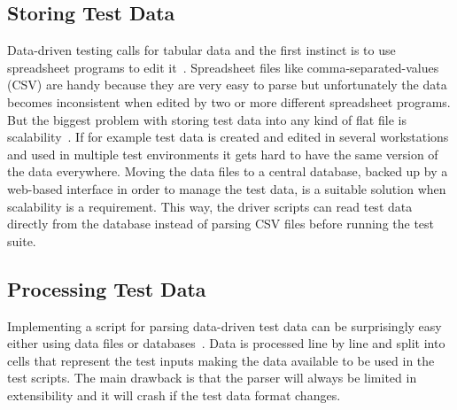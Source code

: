 \subsection{Storing Test Data}

Data-driven testing calls for tabular data and the first instinct is to use
spreadsheet programs to edit it~\cite{Lau07}. Spreadsheet files like
comma-separated-values (CSV) are handy because they are very easy to parse but
unfortunately the data becomes inconsistent when edited by two or more different
spreadsheet programs. But the biggest problem with storing test data into any
kind of flat file is scalability~\cite{Lau07}. If for example test data is
created and edited in several workstations and used in multiple test
environments it gets hard to have the same version of the data everywhere.
Moving the data files to a central database, backed up by a web-based
interface in order to manage the test data, is a suitable solution when
scalability is a requirement. This way, the driver scripts can read test data
directly from the database instead of parsing CSV files before running the
test suite.

\subsection{Processing Test Data}

Implementing a script for parsing data-driven test data can be surprisingly
easy either using data files or databases~\cite{Lau07}. Data is processed line
by line and split into cells that represent the test inputs making the data
available to be used in the test scripts. The main drawback is that the parser
will always be limited in extensibility and it will crash if the test data
format changes.


